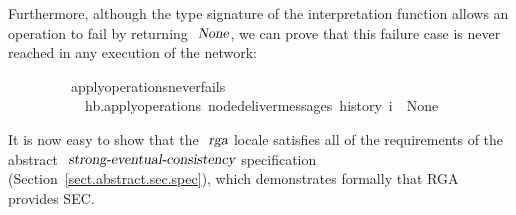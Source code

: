 \vspace{0.35em}
Furthermore, although the type signature of the interpretation function allows an operation to fail by returning $\isa{None}$, we can prove that this failure case is never reached in any execution of the network:
\vspace{0.35em}
\begin{isabellebody}
\ \ \ \ \ \ \ \ \ apply{\isacharunderscore}operations{\isacharunderscore}never{\isacharunderscore}fails{\isacharcolon}\isanewline
\ \ \ \ \ \ \ \ \ \ \ {\isachardoublequoteopen}hb.apply{\isacharunderscore}operations\ {\isacharparenleft}node{\isacharunderscore}deliver{\isacharunderscore}messages\ {\isacharparenleft}history\ i{\isacharparenright}{\isacharparenright}\ {\isasymnoteq}\ None{\isachardoublequoteclose}
\end{isabellebody}
\vspace{0.35em}
It is now easy to show that the $\isa{rga}$ locale satisfies all of the requirements of the abstract $\isa{strong-eventual-consistency}$ specification (Section~\ref{sect.abstract.sec.spec}), which demonstrates formally that RGA provides SEC.
